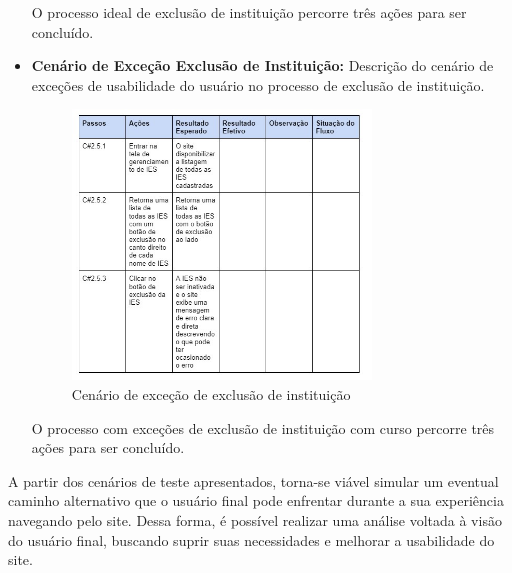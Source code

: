 \begin{itemize}
O processo ideal de exclusão de instituição percorre três ações para ser concluído.

\newpage

 \item \textbf{Cenário de Exceção Exclusão de Instituição:}
Descrição do cenário de exceções de usabilidade do usuário no processo de exclusão de instituição.

\begin{figure}[ht]
        \centering
\includegraphics[width=0.75\textwidth]{images/teste-exc-instituicao-excecao.jpg}
        \caption{Cenário de exceção de exclusão de instituição}
        \label{commitsAturo}
\end{figure}
O processo com exceções de exclusão de instituição com curso percorre três ações para ser concluído.

\end{itemize}

A partir dos cenários de teste apresentados, torna-se viável simular um eventual caminho alternativo que o usuário final pode enfrentar durante a sua experiência navegando pelo site. Dessa forma, é possível realizar uma análise voltada à visão do usuário final, buscando suprir suas necessidades e melhorar a usabilidade do site.



